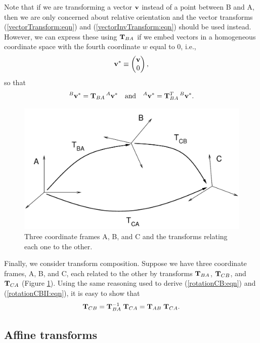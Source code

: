 Note that if we are transforming a vector ${\bf v}$ instead of a point
between B and A, then we are only concerned about relative orientation
and the vector transforms (\ref{vectorTransform:eqn}) and
(\ref{vectorInvTransform:eqn}) should be used instead.
However, we can express these using ${\bf T}_{BA}$ if
we embed vectors in a homogeneous coordinate space 
with the fourth coordinate $w$ equal to 0, i.e.,
%
\begin{equation}
{\bf v}^* \equiv \left(\begin{matrix} {\bf v} \\ 0 \end{matrix}\right),
\end{equation}
%
so that
%
\begin{equation*}
{}^B{\bf v}^* = {\bf T}_{BA} \, {}^A{\bf v}^* \quad \text{and} \quad
{}^A{\bf v}^* = {\bf T}_{BA}^T \, {}^B{\bf v}^*.
\end{equation*}
%

\begin{figure}[t]
\begin{center}
 \includegraphics[width=4.5in]{images/transformABC}
\end{center}
\caption{Three coordinate frames A, B, and C and the transforms
relating each one to the other.}
\label{transformsABC:fig}
\end{figure}

Finally, we consider transform composition. Suppose we have three
coordinate frames, A, B, and C, each related to the other by
transforms ${\bf T}_{BA}$, ${\bf T}_{CB}$, and ${\bf T}_{CA}$ (Figure
\ref{transformsABC:fig}).  Using the same reasoning used to derive
(\ref{rotationCB:eqn}) and (\ref{rotationCBII:eqn}), it is easy to
show that
%
\begin{equation}
{\bf T}_{CB} = {\bf T}_{BA}^{-1} \; {\bf T}_{CA} = {\bf T}_{AB} \; {\bf T}_{CA}.
\end{equation}
%

\subsection{Affine transforms}
\label{AffineTransforms:sec}

